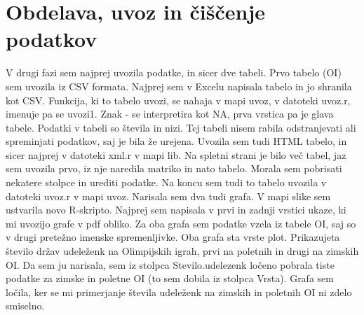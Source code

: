 \documentclass[11pt,a4paper]{article}
\begin{document}
\section{Obdelava, uvoz in čiščenje podatkov}
V drugi fazi sem najprej uvozila podatke, in sicer dve tabeli. Prvo tabelo (OI) sem uvozila iz CSV formata. Najprej sem v Excelu napisala tabelo in jo shranila kot CSV. Funkcija, ki to tabelo uvozi, se nahaja v mapi uvoz, v datoteki uvoz.r, imenuje pa se uvozi1. Znak - se interpretira kot NA, prva vrstica pa je glava tabele. Podatki v tabeli so števila in nizi. Tej tabeli nisem rabila odstranjevati  ali spreminjati podatkov, saj je bila že urejena.
Uvozila sem tudi HTML tabelo, in sicer najprej v datoteki xml.r v mapi lib. Na spletni strani je bilo več tabel, jaz sem uvozila prvo, iz nje naredila matriko in nato tabelo. Morala sem pobrisati nekatere stolpce in urediti podatke. Na koncu sem tudi to tabelo uvozila v datoteki uvoz.r v mapi uvoz.
Narisala sem dva tudi grafa. V mapi slike sem ustvarila novo R-skripto. Najprej sem napisala v prvi in zadnji vrstici ukaze, ki mi uvozijo grafe v pdf obliko. Za oba grafa sem podatke vzela iz tabele OI, saj so v drugi pretežno imenske spremenljivke.
Oba grafa sta vrste plot. Prikazujeta število držav udeleženk na Olimpijskih igrah, prvi na poletnih in drugi na zimskih OI. Da sem ju narisala, sem iz stolpca Stevilo.udelezenk ločeno pobrala tiste podatke za zimske in poletne OI (to sem dobila iz stolpca Vrsta). Grafa sem ločila, ker se mi primerjanje števila udeleženk na zimskih in poletnih OI ni zdelo smiselno.
 



% 
% 
% 
\end{document}
